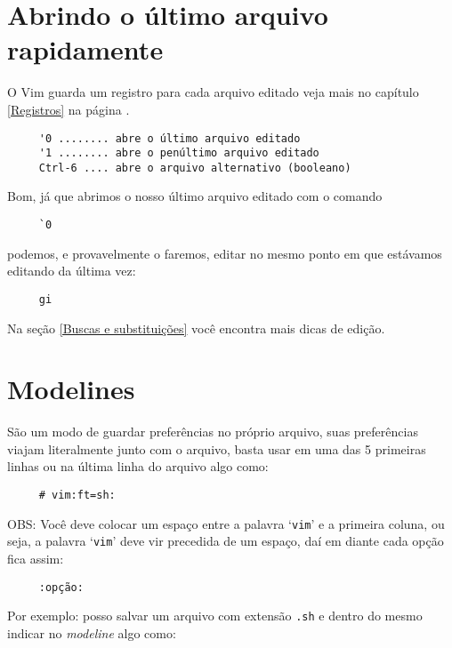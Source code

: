 \section{Abrindo o último arquivo rapidamente}

O Vim guarda um registro para cada arquivo editado veja
mais no capítulo \ref{Registros} na página \pageref{Registros}.

\begin{verbatim}
     '0 ........ abre o último arquivo editado
     '1 ........ abre o penúltimo arquivo editado
     Ctrl-6 .... abre o arquivo alternativo (booleano)
\end{verbatim}

Bom, já que abrimos o nosso último arquivo editado com o comando

\begin{verbatim}
     `0
\end{verbatim}

podemos, e provavelmente o faremos, editar no mesmo ponto em que estávamos
editando da última vez:

\begin{verbatim}
     gi
\end{verbatim}

Na seção \ref{Buscas e substituições} você encontra mais dicas de edição.


\section{Modelines}\label{sec:Modelines}

São um modo de guardar preferências no próprio arquivo, suas
preferências viajam literalmente junto com o arquivo, basta usar em
uma das 5 primeiras linhas ou na última linha do arquivo algo
como:

\begin{verbatim}
     # vim:ft=sh:
\end{verbatim}

OBS: Você deve colocar um espaço entre a palavra `{\tt vim}' e a primeira
coluna, ou seja, a palavra `{\tt vim}' deve vir precedida de um espaço, daí
em diante cada opção fica assim:

\begin{verbatim}
     :opção:
\end{verbatim}

Por exemplo: posso salvar um arquivo com extensão \verb|.sh| e dentro do
mesmo indicar no {\em modeline} algo como:

